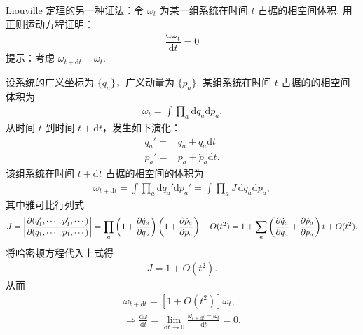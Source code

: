 \documentclass{assignment}
\begin{document}
\begin{prob}
    Liouville 定理的另一种证法：令 $\omega_t$ 为某一组系统在时间 $t$ 占据的相空间体积. 用正则运动方程证明：
    \[
        \frac{\mathrm{d}\omega_t}{\mathrm{d}t}=0
    \]
    提示：考虑 $\omega_{t+\mathrm{d}t}-\omega_t$.
\end{prob}
\begin{pf}
    设系统的广义坐标为 $\{q_a\}$，广义动量为 $\{p_a\}$. 某组系统在时间 $t$ 占据的的相空间体积为
    \begin{align}
        \omega_t=\int\prod_a\mathrm{d}q_a\mathrm{d}p_a.
    \end{align}
    从时间 $t$ 到时间 $t+\mathrm{d}t$，发生如下演化：
    \begin{align}
        q_a'=&q_a+\dot{q}_a\mathrm{d}t\\
        p_a'=&p_a+\dot{p}_a\mathrm{d}t.
    \end{align}
    该组系统在时间 $t+\mathrm{d}t$ 占据的相空间的体积为
    \begin{align}
        \omega_{t+\mathrm{d}t}=\int\prod_a\mathrm{d}q_a'\mathrm{d}p_a'=\int\prod_aJ\,\mathrm{d}q_a\mathrm{d}p_a,
    \end{align}
    其中雅可比行列式
    \begin{align}
        J=\left\lvert\frac{\partial(q_1',\cdots;p_1',\cdots)}{\partial(q_1,\cdots;p_1,\cdots)}\right\rvert=\prod_a\left(1+\frac{\partial\dot{q}_a}{\partial q_a}\right)\left(1+\frac{\partial\dot{p}_a}{\partial p_a}\right)+O(t^2)=1+\sum_a\left(\frac{\partial\dot{q}_a}{\partial q_a}+\frac{\partial\dot{p}_a}{\partial p_a}\right)t+O(t^2).
    \end{align}
    将哈密顿方程代入上式得
    \begin{align}
        J=1+O(t^2).
    \end{align}
    从而
    \begin{gather}
        \omega_{t+\mathrm{d}t}=[1+O(t^2)]\omega_t,\\
        \Longrightarrow\frac{\mathrm{d}\omega}{\mathrm{d}t}=\lim_{\mathrm{d}t\rightarrow 0}\frac{\omega_{t+\mathrm{d}t}-\omega_t}{\mathrm{d}t}=0.
    \end{gather}
\end{pf}
\end{document}
